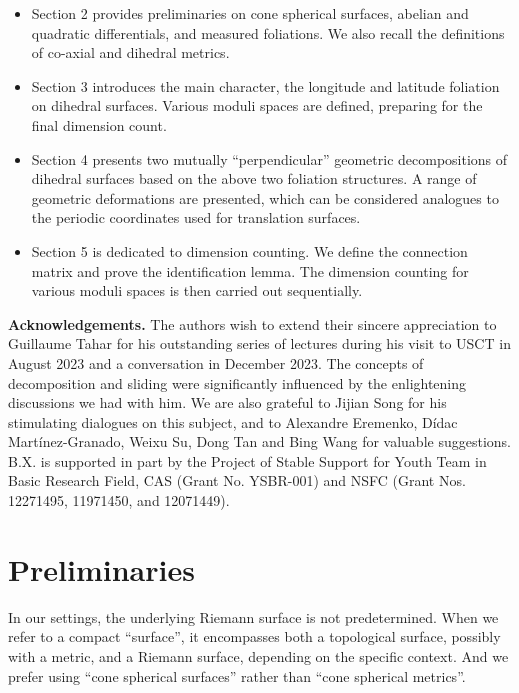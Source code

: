 \documentclass[pdflatex,sn-mathphys]{sn-jnl}%
\numberwithin{equation}{section}
\theoremstyle{thmstyleone}%
\newcommand{\csphsf}{cone spherical surface}
\newcommand{\csphmtr}{cone spherical metric}
\begin{document}
\begin{itemize}
    \item Section 2 provides preliminaries on \csphsf s, abelian and quadratic differentials, and measured foliations. We also recall the definitions of co-axial and dihedral metrics.
    \item Section 3 introduces the main character, the longitude and latitude foliation on dihedral surfaces. Various moduli spaces are defined, preparing for the final dimension count. %
    \item Section 4 presents two mutually “perpendicular” geometric decompositions of dihedral surfaces based on the above two foliation structures. 
    A range of geometric deformations are presented, which can be considered analogues to the periodic coordinates used for translation surfaces.
    \item Section 5 is dedicated to dimension counting. We define the connection matrix and prove the identification lemma. The dimension counting for various moduli spaces is then carried out sequentially. %
\end{itemize}

\noindent \textbf{Acknowledgements.} The authors wish to extend their sincere appreciation to Guillaume Tahar for his outstanding series of lectures during his visit to USCT in August 2023 and a conversation in December 2023. The concepts of decomposition and sliding were significantly influenced by the enlightening discussions we had with him. We are also grateful to Jijian Song for his stimulating dialogues on this subject, and to Alexandre Eremenko, Dídac Martínez-Granado, Weixu Su, Dong Tan and Bing Wang for valuable suggestions. 
B.X. is supported in part by the Project of Stable Support for Youth Team in Basic Research Field, CAS (Grant No. YSBR-001) and NSFC (Grant Nos. 12271495, 11971450, and 12071449).

\section{Preliminaries} \label{sec:csphsf}
In our settings, the underlying Riemann surface is not predetermined. When we refer to a compact ``surface'', it encompasses both a topological surface, possibly with a metric, and a Riemann surface, depending on the specific context. And we prefer using ``\csphsf s'' rather than ``\csphmtr s''.
\end{document}
